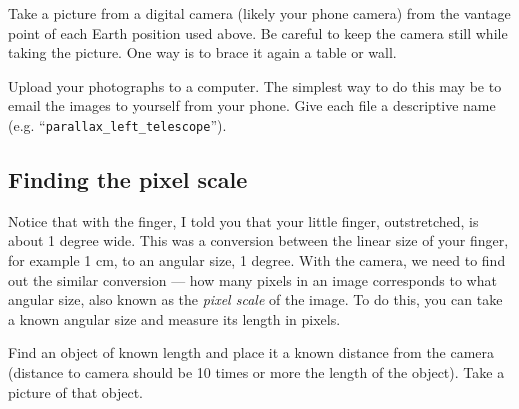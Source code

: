 \begin{steps}
	\item Take a picture from a digital camera (likely your phone camera) from the vantage point of each Earth position used above. Be careful to keep the camera still while taking the picture. One way is to brace it again a table or wall.
	
	


	\item Upload your photographs to a computer. The simplest way to do this may be to email the images to yourself from your phone. Give each file a descriptive name (e.g. ``\texttt{parallax\_left\_telescope}'').
\end{steps}

\subsection{Finding the pixel scale}

Notice that with the finger, I told you that your little finger, outstretched, is about 1 degree wide. This was a conversion between the linear size of your finger, for example 1 cm, to an angular size, 1 degree. With the camera, we need to find out the similar conversion --- how many pixels in an image corresponds to what angular size, also known as the \textit{pixel scale} of the image. To do this, you can take a known angular size and measure its length in pixels.
\begin{steps}
	\item Find an object of known length and place it a known distance from the camera (distance to camera should be 10 times or more the length of the object). Take a picture of that object.
\end{steps}

